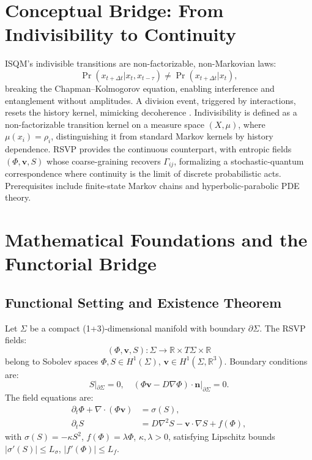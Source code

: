 \documentclass[12pt]{article}
\begin{document}
\section{Conceptual Bridge: From Indivisibility to Continuity}

ISQM’s indivisible transitions are non-factorizable, non-Markovian laws:
\[
\Pr(x_{t+\Delta t} | x_t, x_{t-\tau}) \neq \Pr(x_{t+\Delta t} | x_t),
\]
breaking the Chapman–Kolmogorov equation, enabling interference and entanglement without amplitudes. A division event, triggered by interactions, resets the history kernel, mimicking decoherence \citep{Barandes2023}. Indivisibility is defined as a non-factorizable transition kernel on a measure space \((X, \mu)\), where \(\mu(x_i) = \rho_i\), distinguishing it from standard Markov kernels by history dependence. RSVP provides the continuous counterpart, with entropic fields \((\Phi, \mathbf{v}, S)\) whose coarse-graining recovers \(\Gamma_{ij}\), formalizing a stochastic-quantum correspondence where continuity is the limit of discrete probabilistic acts. Prerequisites include finite-state Markov chains and hyperbolic-parabolic PDE theory.

\section{Mathematical Foundations and the Functorial Bridge}

\subsection{Functional Setting and Existence Theorem}

Let \(\Sigma\) be a compact (1+3)-dimensional manifold with boundary \(\partial \Sigma\). The RSVP fields:
\[
(\Phi, \mathbf{v}, S): \Sigma \to \mathbb{R} \times T\Sigma \times \mathbb{R}
\]
belong to Sobolev spaces \(\Phi, S \in H^1(\Sigma)\), \(\mathbf{v} \in H^1(\Sigma, \mathbb{R}^3)\). Boundary conditions are:
\[
S|_{\partial \Sigma} = 0, \quad (\Phi \mathbf{v} - D \nabla \Phi) \cdot \mathbf{n}|_{\partial \Sigma} = 0.
\]
The field equations are:
\begin{align}
\partial_t \Phi + \nabla \cdot (\Phi \mathbf{v}) &= \sigma(S), \label{eq:PDE1} \\
\partial_t S &= D \nabla^2 S - \mathbf{v} \cdot \nabla S + f(\Phi), \label{eq:PDE2}
\end{align}
with \(\sigma(S) = -\kappa S^2\), \(f(\Phi) = \lambda \Phi\), \(\kappa, \lambda > 0\), satisfying Lipschitz bounds \(|\sigma'(S)| \leq L_\sigma\), \(|f'(\Phi)| \leq L_f\).
\end{document}
